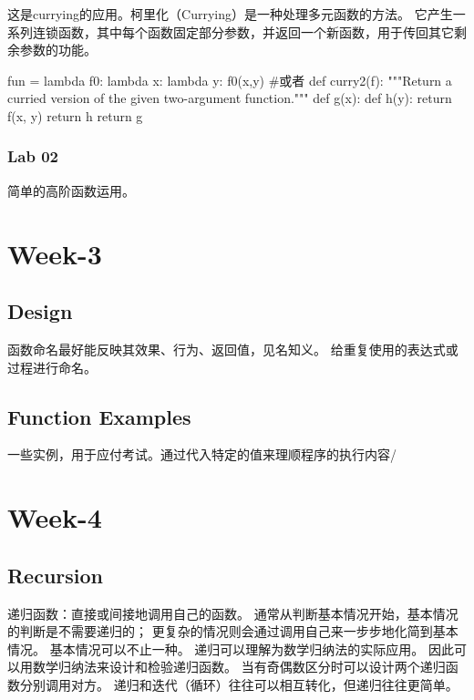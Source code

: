 \documentclass{ctexart}
\begin{document}
这是currying的应用。柯里化（Currying）是一种处理多元函数的方法。
它产生一系列连锁函数，其中每个函数固定部分参数，并返回一个新函数，用于传回其它剩余参数的功能。

\begin{python}
    fun = lambda f0: lambda x: lambda y: f0(x,y)
    #或者
    def curry2(f):
        """Return a curried version of the given two-argument function."""
        def g(x):
            def h(y):
                return f(x, y)
            return h
        return g   
\end{python}

\subsubsection{Lab 02}

简单的高阶函数运用。

\section{Week-3}

\subsection{Design}

函数命名最好能反映其效果、行为、返回值，见名知义。
给重复使用的表达式或过程进行命名。

\subsection{Function Examples}

 一些实例，用于应付考试。通过代入特定的值来理顺程序的执行内容/
 
\section{Week-4}

\subsection{Recursion}

递归函数：直接或间接地调用自己的函数。
通常从判断基本情况开始，基本情况的判断是不需要递归的；
更复杂的情况则会通过调用自己来一步步地化简到基本情况。
基本情况可以不止一种。
递归可以理解为数学归纳法的实际应用。
因此可以用数学归纳法来设计和检验递归函数。
当有奇偶数区分时可以设计两个递归函数分别调用对方。
递归和迭代（循环）往往可以相互转化，但递归往往更简单。
\end{document}

